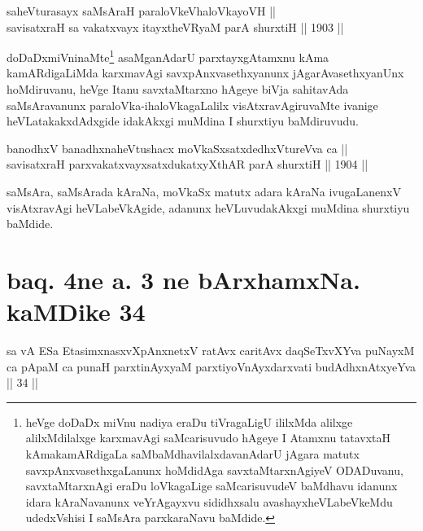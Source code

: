 \begin{shl}
saheVturasayx saMsAraH paraloVkeVhaloVkayoVH || \\
savisatxraH sa vakatxvayx itayxtheVRyaM parA shurxtiH \hfill || 1903 ||
  
\end{shl}

\begin{artha}
doDaDxmiVninaMte\footnote[1]{heVge doDaDx miVnu nadiya eraDu
tiVragaLigU ililxMda alilxge alilxMdilalxge karxmavAgi saMcarisuvudo
hAgeye I Atamxnu tatavxtaH kAmakamARdigaLa saMbaMdhavilalxdavanAdarU
jAgara matutx savxpAnxvasethxgaLanunx hoMdidAga savxtaMtarxnAgiyeV
ODADuvanu, savxtaMtarxnAgi eraDu loVkagaLige saMcarisuvudeV baMdhavu
idanunx idara kAraNavanunx veYrAgayxvu sididhxsalu avashayxheVLabeVkeMdu udedxVshisi I saMsAra parxkaraNavu baMdide.} asaMganAdarU parxtayxgAtamxnu kAma
kamARdigaLiMda karxmavAgi savxpAnxvasethxyanunx jAgarAvasethxyanUnx
hoMdiruvanu, heVge Itanu savxtaMtarxno hAgeye biVja sahitavAda
saMsAravanunx paraloVka-ihaloVkagaLalilx visAtxravAgiruvaMte ivanige
heVLatakakxdAdxgide idakAkxgi muMdina I shurxtiyu baMdiruvudu.
\end{artha}


\begin{shl}
banodhxV banadhxnaheVtushacx moVkaSxsatxdedhxVtureVva ca || \\
savisatxraH parxvakatxvayxsatxdukatxyXthAR parA shurxtiH \hfill || 1904 ||
  
\end{shl}

\begin{artha}
saMsAra, saMsArada kAraNa, moVkaSx matutx adara kAraNa ivugaLanenxV
visAtxravAgi heVLabeVkAgide, adanunx heVLuvudakAkxgi muMdina shurxtiyu
baMdide.
\end{artha}

\section*{baq. 4ne a. 3 ne bArxhamxNa. kaMDike 34}

\begin{shl}
sa vA ESa EtasimxnasxvXpAnxnetxV ratAvx caritAvx daqSeTxvXYva puNayxM ca pApaM ca punaH parxtinAyxyaM parxtiyoVnAyxdarxvati budAdhxnAtxyeYva || 34 ||
\end{shl}


